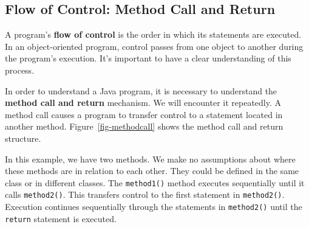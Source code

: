 
\subsection{Flow of Control: Method Call and Return}
\label{sec-methodcall}
\label{pg-sec-methodcall}

\noindent A program's {\bf flow of control} is the order
in which its statements are executed. In an object-oriented program,
control passes from one object to another during the program's
execution. It's important to have a clear understanding of this
process.

In order to understand a Java program, it is necessary to understand
the {\bf method call and return} mechanism. We will encounter it
repeatedly.  A method call causes a program to transfer control to a
statement located in another method. Figure~\ref{fig-methodcall} shows
the method call and return structure.
\begin{figure}[h!]
\end{figure}

In this example, we have two methods. We make no assumptions about
where these methods are in relation to each other. They could be
defined in the same class or in different classes. The {\tt method1()}
method executes sequentially until it calls {\tt method2()}.  This
transfers control to the first statement in {\tt method2()}. Execution
continues sequentially through the statements in {\tt method2()} until
the {\tt return} statement is executed.


